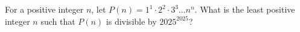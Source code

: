 For a positive integer $n$, let $P(n)=1^1\cdot2^2\cdot3^3\dots n^n$. What is the least positive integer $n$ such that $P(n)$ is divisible by $2025^{2025}$?
